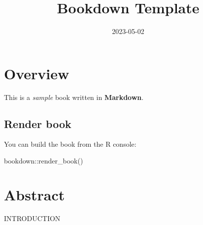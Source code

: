 \documentclass[
]{book}
\title{Bookdown Template}
\author{}
\date{\vspace{-2.5em}2023-05-02}
\newenvironment{Shaded}{\begin{snugshade}}{\end{snugshade}}
\newcommand{\FunctionTok}[1]{\textcolor[rgb]{0.00,0.00,0.00}{#1}}
\newcommand{\NormalTok}[1]{#1}
\newcommand{\SpecialCharTok}[1]{\textcolor[rgb]{0.00,0.00,0.00}{#1}}
\begin{document}
\maketitle

{
\setcounter{tocdepth}{1}
\tableofcontents
}
\hypertarget{overview}{%
\chapter{Overview}\label{overview}}

This is a \emph{sample} book written in \textbf{Markdown}.

\hypertarget{render-book}{%
\section{Render book}\label{render-book}}

You can build the book from the R console:

\begin{Shaded}
\begin{Highlighting}[]
\NormalTok{bookdown}\SpecialCharTok{::}\FunctionTok{render\_book}\NormalTok{()}
\end{Highlighting}
\end{Shaded}

\hypertarget{abstract}{%
\chapter{Abstract}\label{abstract}}

INTRODUCTION
\end{document}
